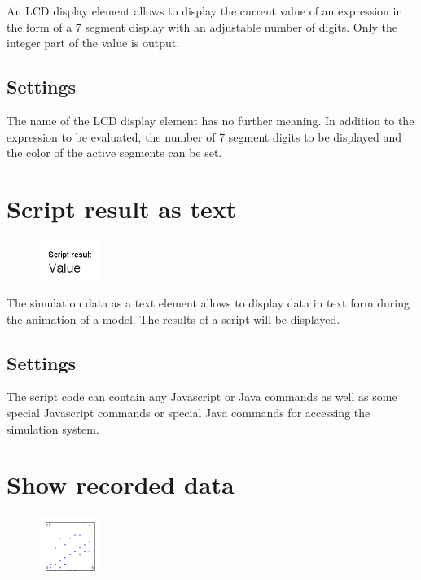 An LCD display element allows to display the current value of an expression
in the form of a 7 segment display with an adjustable number of digits.
Only the integer part of the value is output. 

\subsection*{Settings}

The name of the LCD display element has no further meaning.
In addition to the expression to be evaluated, the number of
7 segment digits to be displayed and the color of the active
segments can be set.


\section{Script result as text}
\label{ref:ModelElementAnimationTextJS}

\begin{figure}
\vspace{-22pt}
\includegraphics[width=2cm]{imageModelElementAnimationTextJS.png}
\vspace{-22pt}
\end{figure}

The simulation data as a text element allows to display data in text form during the animation of a model.
The results of a script will be displayed.

\subsection*{Settings}

The script code can contain any Javascript or Java commands as well as some
special Javascript commands or special Java commands 
for accessing the simulation system.


\section{Show recorded data}
\label{ref:ModelElementAnimationRecord}

\begin{figure}
\vspace{-22pt}
\includegraphics[width=2cm]{imageModelElementAnimationRecord.png}
\vspace{-22pt}
\end{figure}

